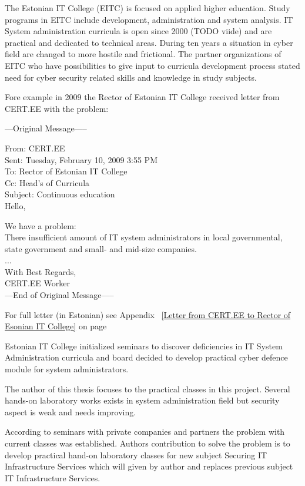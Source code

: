 The Estonian IT College (\gls{EITC}) is focused on applied higher education. Study programs in \gls{EITC} include development, administration and system analysis. IT System administration curricula is open since 2000 {\color{red}(TODO viide)} and are practical and dedicated to technical areas. During ten years a situation in cyber field are changed to more hostile and frictional. The partner organizations of \gls{EITC} who have possibilities to give input to curricula development process stated need for cyber security related skills and knowledge in study subjects.

Fore example in 2009 the Rector of Estonian IT College received letter from \gls{CERT.EE} with the problem:\par

{
\begin{spacing}{1} 
\scriptsize
---Original Message-----

From: CERT.EE\\
Sent: Tuesday, February 10, 2009 3:55 PM\\
To: Rector of Estonian IT College\\
Cc: Head's of Curricula \\
Subject: Continuous education\\
Hello,

We have a problem:\\
There insufficient amount of IT system administrators in local  governmental, state government and small- and mid-size companies.\\
...\\
With Best Regards,\\
CERT.EE Worker\\
---End of Original Message-----
\end{spacing}
}

For full letter (in Estonian) see Appendix ~\ref{Letter from CERT.EE to Rector of Esonian IT College} on page ~\pageref{Letter from CERT.EE to Rector of Esonian IT College}

Estonian IT College initialized seminars to discover deficiencies in IT System Administration curricula and board decided to develop practical cyber defence module for system administrators.

The author of this thesis focuses to the practical classes in this project. Several hands-on laboratory works exists in system administration field but security aspect is weak and needs improving.

According to seminars with private companies and partners the problem with current classes was established. Authors contribution to solve the problem is to develop practical hand-on laboratory classes for new subject Securing IT Infrastructure Services which will given by author and replaces previous subject IT Infrastructure Services. 


